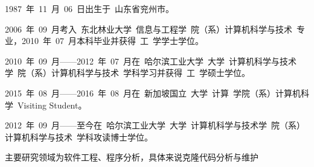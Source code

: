 


1987~年~11~月~06~日出生于~山东省兖州市。

2006~年~09~月考入~东北林业大学~信息与工程学~院（系）计算机科学与技术~专业，2010~年~07~月本科毕业并获得~工~学学士学位。

2010~年~09~月------2012~年~07~月在~哈尔滨工业大学~大学~计算机科学与技术学~院（系）计算机科学与技术~学科学习并获得~工~学硕士学位。

2015~年~08~月------2016~年~08~月在~新加坡国立~大学~计算~学院（系）计算机科学~Visiting Student。

2012~年~09~月------至今在~哈尔滨工业大学~大学~计算机科学与技术学~院（系）计算机科学与技术~学科攻读博士学位。



主要研究领域为软件工程、程序分析，具体来说克隆代码分析与维护

\vspace{3em}\noindent
